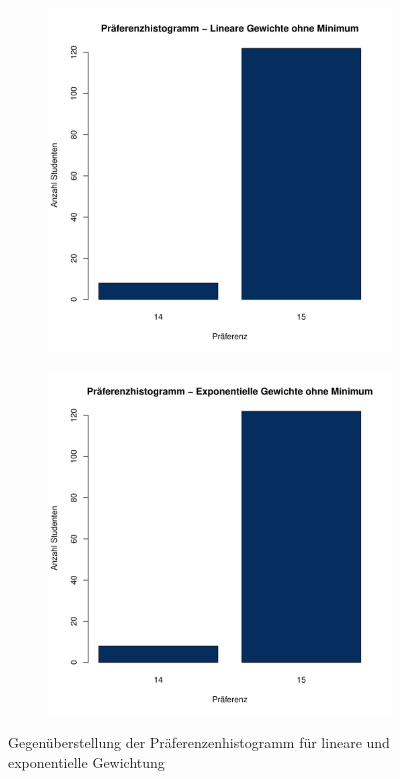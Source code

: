 			\begin{figure}
				\centering
				\begin{subfigure}{0.49\textwidth}
					\includegraphics[width=1.0\textwidth]{./testing/images/EqualDistPreferencesHistLin.jpg}
				\end{subfigure}
				\begin{subfigure}{0.49\textwidth}
					\includegraphics[width=1.0\textwidth]{./testing/images/EqualDistPreferencesHistExpo.jpg}
				\end{subfigure}
				\caption{Gegenüberstellung der Präferenzenhistogramm für lineare und exponentielle Gewichtung}
				\label{fig:test_equal_distribution_histogram}
			\end{figure}
			
